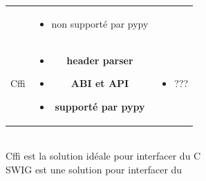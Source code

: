 \begin{frame}
\begin{center}
\begin{tabular}{ccc}
\begin{minipage}[t]{.2\linewidth}
\begin{itemize}
        \end{itemize}
      \end{minipage} &
      \begin{minipage}[t]{.45\linewidth}
        \tiny
        \begin{itemize}
          \item non supporté par pypy
        \end{itemize}
      \end{minipage} \\[1em]
      Cffi &
      \begin{minipage}[t]{.2\linewidth}
        \tiny
        \begin{itemize}
        \item \textbf{header parser}
        \item \textbf{ABI et API}
        \item \textbf{supporté par pypy}
        \end{itemize}
      \end{minipage} &
      \begin{minipage}[t]{.45\linewidth}
        \tiny
        \begin{itemize}
        \item ???
        \end{itemize}
      \end{minipage}
    \end{tabular} \\[1em]
    \alert{Cffi est la solution idéale pour interfacer du C} \\[.5em]
    \alert{SWIG est une solution pour interfacer du \Cpp}
  \end{center}
\end{frame}


